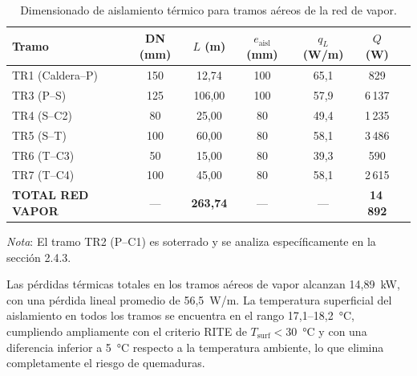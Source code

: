 \documentclass[12pt]{article}
\begin{document}
\begin{table}[H]
	\centering
	\normalsize
	\setlength{\tabcolsep}{3pt}
	\caption{Dimensionado de aislamiento térmico para tramos aéreos de la red de vapor.}
	\label{tab:aislamiento_vapor_aereo}
	\begin{tabular}{lcccccc}
		\toprule
		\textbf{Tramo}           & \textbf{DN (mm)} & \textbf{$L$ (m)}  & \textbf{$e_{\text{aisl}}$ (mm)} & \textbf{$q_L$ (W/m)} & \textbf{$Q$ (W)} \\
		\midrule
		TR1 (Caldera--P)         & 150              & 12{,}74           & 100                             & 65{,}1               & 829              \\
		TR3 (P--S)               & 125              & 106{,}00          & 100                             & 57{,}9               & 6\,137           \\
		TR4 (S--C2)           & 80               & 25{,}00           & 80                              & 49{,}4               & 1\,235           \\
		TR5 (S--T)               & 100              & 60{,}00           & 80                              & 58{,}1               & 3\,486           \\
		TR6 (T--C3)           & 50               & 15{,}00           & 80                              & 39{,}3               & 590              \\
		TR7 (T--C4)           & 100              & 45{,}00           & 80                              & 58{,}1               & 2\,615           \\
		\midrule
		\textbf{TOTAL RED VAPOR} & ---              & \textbf{263{,}74} & ---                             & ---                  & \textbf{14\,892} \\
		\bottomrule
	\end{tabular}
	
	\vspace{0.3cm}

	\noindent \small \textit{Nota}: El tramo TR2 (P--C1) es soterrado y se analiza específicamente en la sección 2.4.3.
\end{table}

Las pérdidas térmicas totales en los tramos aéreos de vapor alcanzan 14{,}89~kW, con una pérdida lineal promedio de 56{,}5~W/m. La temperatura superficial del aislamiento en todos los tramos se encuentra en el rango 17{,}1--18{,}2~°C, cumpliendo ampliamente con el criterio RITE de $T_{\text{surf}} < 30$~°C y con una diferencia inferior a 5~°C respecto a la temperatura ambiente, lo que elimina completamente el riesgo de quemaduras.
\end{document}
